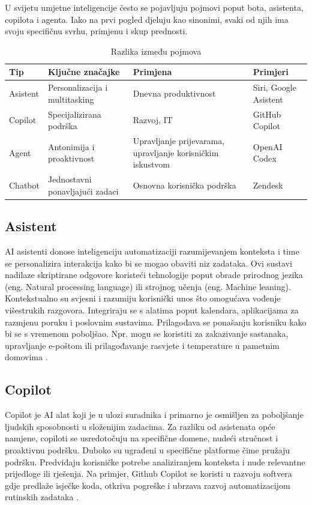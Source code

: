 \documentclass[]{foi}
\begin{document}
U svijetu umjetne inteligencije često se pojavljuju pojmovi poput bota, asistenta, copilota i agenta. Iako na prvi pogled djeluju kao sinonimi, svaki od njih ima svoju specifičnu svrhu, primjenu i skup prednosti.

\begin{table}[h!]
\centering
\begin{tabularx}{\textwidth}{|l|X|X|X|}
\hline
\textbf{Tip} & \textbf{Ključne značajke} & \textbf{Primjena} & \textbf{Primjeri} \\
\hline
Asistent & Personalizacija i multitasking & Dnevna produktivnost & Siri, Google Asistent \\
Copilot  & Specijalizirana podrška & Razvoj, IT & GitHub Copilot \\
Agent    & Antonimija i proaktivnost & Upravljanje prijevarama, upravljanje korisničkim iskustvom & OpenAI Codex \\
Chatbot  & Jednostavni ponavljajući zadaci & Osnovna korisnička podrška & Zendesk \\
\hline
\end{tabularx}
\caption{Razlika između pojmova \cite{exomindset2025difference}}
\label{tab:chatbot_usporedba}
\end{table}


\subsection{Asistent}

AI asistenti donose inteligenciju automatizaciji razumijevanjem konteksta i time se personalizira interakcija kako bi se mogao obaviti niz zadataka. Ovi sustavi nadilaze skriptirane odgovore
koristeći tehnologije poput obrade prirodnog jezika (eng. Natural processing language) ili strojnog učenja (eng. Machine leaning). Kontekstualno su svjesni i razumiju korisnički unos što omogućava
vođenje višestrukih razgovora. Integriraju se s alatima poput kalendara, aplikacijama za razmjenu poruku i poslovnim sustavima. Prilagođava se ponašanju korisniku kako bi se s vremenom poboljšao.
Npr. mogu se koristiti za zakazivanje sastanaka, upravljanje e-poštom ili prilagođavanje rasvjete i temperature u pametnim domovima \cite{exomindset2025difference}.

\subsection{Copilot}

Copilot je AI alat koji je u ulozi suradnika i primarno je osmišljen za poboljšanje ljudskih sposobnosti u složenijim zadacima. Za razliku od asistenata opće namjene, copiloti se usredotočuju na specifične domene,
nudeći stručnost i proaktivnu podršku. Duboko su ugrađeni u specifične platforme čime pružaju podršku. Predviđaju korisničke potrebe analiziranjem konteksta i nude relevantne prijedloge ili rješenja.
Na primjer, Github Copilot se koristi u razvoju softvera gdje predlaže isječke koda, otkriva pogreške i ubrzava razvoj automatizacijom rutinskih zadataka \cite{exomindset2025difference}.
\end{document}
